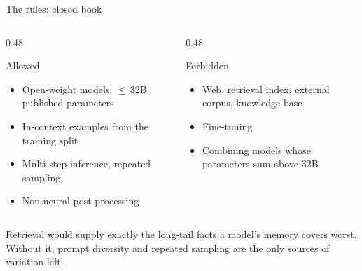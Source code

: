 \documentclass[aspectratio=169,10pt]{beamer}
\newcommand{\ok}{\textcolor{good}{\faCheck}}
\newcommand{\no}{\textcolor{bad}{\faTimes}}
\begin{document}
\begin{frame}{The rules: closed book}
  \begin{columns}[T]
    \begin{column}{0.48\textwidth}
      \begin{block}{Allowed}
        \begin{itemize}
          \item[\ok] Open-weight models, $\le$\,32B published parameters
          \item[\ok] In-context examples from the training split
          \item[\ok] Multi-step inference, repeated sampling
          \item[\ok] Non-neural post-processing
        \end{itemize}
      \end{block}
    \end{column}
    \begin{column}{0.48\textwidth}
      \begin{block}{Forbidden}
        \begin{itemize}
          \item[\no] Web, retrieval index, external corpus, knowledge base
          \item[\no] Fine-tuning
          \item[\no] Combining models whose parameters sum above 32B
        \end{itemize}
      \end{block}
    \end{column}
  \end{columns}

  \vspace{5mm}
  Retrieval would supply exactly the long-tail facts a model's memory covers
  worst. Without it, \alert{prompt diversity and repeated sampling} are the
  only sources of variation left.
\end{frame}
\end{document}

